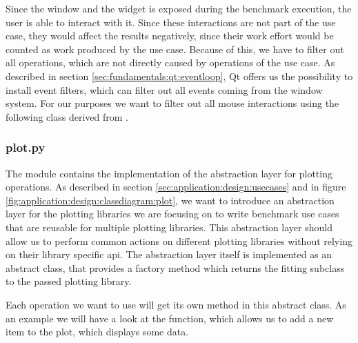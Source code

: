 

Since the window and the widget is exposed during the benchmark execution, the
user is able to interact with it. Since these interactions are not part of the
use case, they would affect the results negatively, since their work effort
would be counted as work produced by the use case. Because of this, we have to
filter out all operations, which are not directly caused by operations of the
use case. As described in section \ref{sec:fundamentals:qt:eventloop}, Qt offers
us the possibility to install event filters, which can filter out all events
coming from the window system. For our purposes we want to filter out all mouse
interactions using the following class derived from
.



\subsubsection*{plot.py}

The module  contains the implementation
of the abstraction layer for plotting operations.  As described in section
\ref{sec:application:design:usecases} and in figure
\ref{fig:application:design:classdiagram:plot}, we want to introduce an
abstraction layer for the plotting libraries we are focusing on to write
benchmark use cases that are reusable for multiple plotting libraries.  This
abstraction layer should allow us to perform common actions on different
plotting libraries without relying on their library specific \gls{api}. The
abstraction layer itself is implemented as an abstract class, that provides a
factory method which returns the fitting subclass to the passed plotting
library.



Each operation we want to use will get its own method in this abstract class. As
an example we will have a look at the  function,
which allows us to add a new item to the plot, which displays some data.



